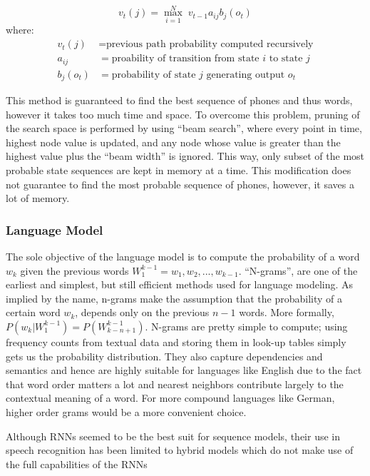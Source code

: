 \begin{equation}
\label{eq:13}
	v_t(j) = \max_{i=1}^N \; v_{t-1} a_{ij} b_j(o_t)
\end{equation}
where:
\begin{align*}
	v_t(j) &= \text{previous path probability computed recursively}\\
	a_{ij} &= \text{proability of transition from state $i$ to state $j$}\\
	b_j(o_t) &= \text{probability of state $j$ generating output $o_t$}
\end{align*}

This method is guaranteed to find the best sequence of phones and thus words, however it takes too much time and space. To overcome this problem, pruning of the search space is performed by using \enquote{beam search}, where every point in time, highest node value is updated, and any node whose value is greater than the highest value plus the \enquote{beam width} is ignored. This way, only subset of the most probable state sequences are kept in memory at a time. This modification does not guarantee to find the most probable sequence of phones, however, it saves a lot of memory.


\subsubsection{Language Model} 
\label{bg:s3_sub1_subsub3}

The sole objective of the language model is to compute the probability of a word $w_k$ given the previous words $W_1^{k-1} = w_1,w_2,...,w_{k-1}$. \enquote{N-grams}, are one of the earliest and simplest, but still efficient methods used for language modeling. As implied by the name, n-grams make the assumption that the probability of a certain word $w_k$, depends only on the previous $n-1$ words. More formally, $P(w_k|W_1^{k-1}) = P(W_{k-n+1}^{k-1}) $. N-grams are pretty simple to compute; using frequency counts from textual data and storing them in look-up tables simply gets us the probability distribution. They also capture dependencies and semantics and hence are highly suitable for languages like English due to the fact that word order matters a lot and nearest neighbors contribute largely to the contextual meaning of a word. For more compound languages like German, higher order grams would be a more convenient choice.  

Although \ac{RNN}s seemed to be the best suit for sequence models, their use in speech recognition has been limited to hybrid models which do not make use of the full capabilities of the \ac{RNN}s

